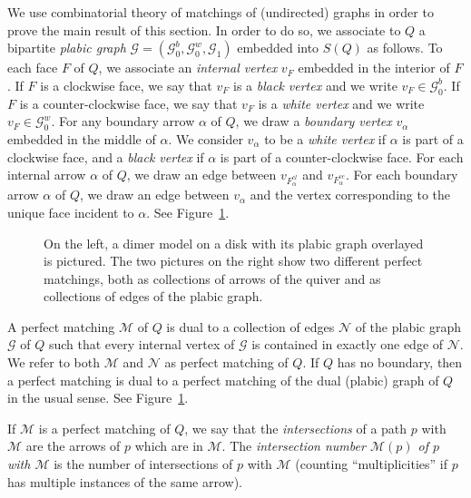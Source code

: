 \documentclass{article}
\theoremstyle{definition}
\begin{document}
We use combinatorial theory of matchings of (undirected) graphs in order to prove the main result of this section. In order to do so, we associate to $Q$ a bipartite \textit{plabic graph} $\mathcal G=(\mathcal G_0^b,\mathcal G_0^w,\mathcal G_1)$ embedded into $S(Q)$ as follows.
To each face $F$ of $Q$, we associate an \textit{internal vertex} $v_F$ embedded in the interior of $F$. If $F$ is a clockwise face, we say that $v_F$ is a \textit{black vertex} and we write $v_F\in\mathcal G_0^b$. If $F$ is a counter-clockwise face, we say that $v_F$ is a \textit{white vertex} and we write $v_F\in\mathcal G_0^w$. 
For any boundary arrow $\alpha$ of $Q$, we draw a \textit{boundary vertex} $v_\alpha$ embedded in the middle of $\alpha$. We consider $v_\alpha$ to be a \textit{white vertex} if $\alpha$ is part of a clockwise face, and a \textit{black vertex} if $\alpha$ is part of a counter-clockwise face.
For each internal arrow $\alpha$ of $Q$, we draw an edge between $v_{F_\alpha^{cl}}$ and $v_{F_\alpha^{cc}}$. For each boundary arrow $\alpha$ of $Q$, we draw an edge between $v_\alpha$ and the vertex corresponding to the unique face incident to $\alpha$. See Figure~\ref{fig:plabic-quiver-strand}.
\def\svgwidth{200pt}
\begin{figure}
	\centering
	
	\caption{On the left, a dimer model on a disk with its plabic graph overlayed is pictured. The two pictures on the right show two different perfect matchings, both as collections of arrows of the quiver and as collections of edges of the plabic graph.}
	\label{fig:plabic-quiver-strand}
\end{figure}

A perfect matching $\mathcal M$ of $Q$ is dual to a collection of edges $\mathcal N$ of the plabic graph $\mathcal G$ of $Q$ such that every internal vertex of $\mathcal G$ is contained in exactly one edge of $\mathcal N$. We refer to both $\mathcal M$ and $\mathcal N$ as perfect matching of $Q$. If $Q$ has no boundary, then a perfect matching is dual to a perfect matching of the dual (plabic) graph of $Q$ in the usual sense. See Figure~\ref{fig:plabic-quiver-strand}.

If $\mathcal M$ is a perfect matching of $Q$, we say that the \textit{intersections} of a path $p$ with $\mathcal M$ are the arrows of $p$ which are in $\mathcal M$. The \textit{intersection number $\mathcal M(p)$ of $p$ with $\mathcal M$} is the number of intersections of $p$ with $\mathcal M$ (counting ``multiplicities'' if $p$ has multiple instances of the same arrow).
\end{document}
